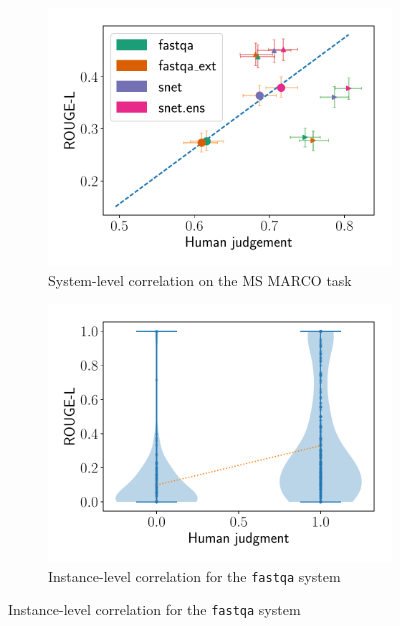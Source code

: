 \begin{figure}[ht]
  \begin{subfigure}{0.49\textwidth}
    \includegraphics[width=\textwidth]{figures/msmarco_bias}
    \caption{\label{fig:bias-msmarco-system} System-level correlation on the MS MARCO task}
  \end{subfigure}
  \hfill
  \begin{subfigure}{0.49\textwidth}
    \includegraphics[width=\textwidth]{figures/msmarco_instance_correlation}
    \caption{\label{fig:bias-msmarco-instance} Instance-level correlation for the \texttt{fastqa} system}
  \end{subfigure}

\end{figure}
